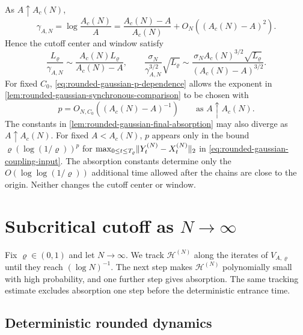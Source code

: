 \documentclass[11pt,reqno,a4paper]{article}
\begin{document}
\begin{remark}
\label{rem:rounded-gaussian-critical-dependence}
  As $A\uparrow A_c(N)$,
  \begin{equation*}
    \gamma_{A,N}
    =
    \log\frac{A_c(N)}A
    =
    \frac{A_c(N)-A}{A_c(N)}+O_N((A_c(N)-A)^2).
  \end{equation*}
  Hence the cutoff center and window satisfy
  \begin{equation*}
    \frac{L_\varrho}{\gamma_{A,N}}
    \sim
    \frac{A_c(N)L_\varrho}{A_c(N)-A},
    \qquad
    \frac{\sigma_N}{\gamma_{A,N}^{3/2}}\sqrt{L_\varrho}
    \sim
    \frac{\sigma_N A_c(N)^{3/2}\sqrt{L_\varrho}}
    {(A_c(N)-A)^{3/2}}.
  \end{equation*}
  For fixed $C_0$, \cref{eq:rounded-gaussian-p-dependence} allows the exponent
  in \cref{lem:rounded-gaussian-synchronous-comparison} to be chosen with
  \begin{equation*}
    p=O_{N,C_0}((A_c(N)-A)^{-1})
    \qquad\mbox{as }A\uparrow A_c(N).
  \end{equation*}
  The constants in \cref{lem:rounded-gaussian-final-absorption} may also
  diverge as $A\uparrow A_c(N)$. For fixed $A<A_c(N)$, $p$ appears only in the
  bound $\varrho(\log(1/\varrho))^p$ for
  $\max_{0\leq t\leq T_\varrho}\lVert Y_t^{(N)}-X_t^{(N)}\rVert_2$ in
  \cref{eq:rounded-gaussian-coupling-input}. The absorption constants determine
  only the $O(\log\log(1/\varrho))$ additional time allowed after the chains
  are close to the origin. Neither changes the cutoff center or window.
\end{remark}

\section{Subcritical cutoff as \texorpdfstring{$N\to\infty$}{N tends to infinity}}
\label{sec:subcritical-dimension}

Fix $\varrho\in(0,1)$ and let $N\to\infty$. We track $\mathscr H^{(N)}$ along
the iterates of $V_{A,\varrho}$ until they reach $(\log N)^{-1}$. The next
step makes $\mathscr H^{(N)}$ polynomially small with high probability, and
one further step gives absorption. The same tracking estimate excludes
absorption one step before the deterministic entrance time.

\subsection{Deterministic rounded dynamics}
\label{subsec:subcritical-deterministic-rounded-dynamics}
\end{document}
